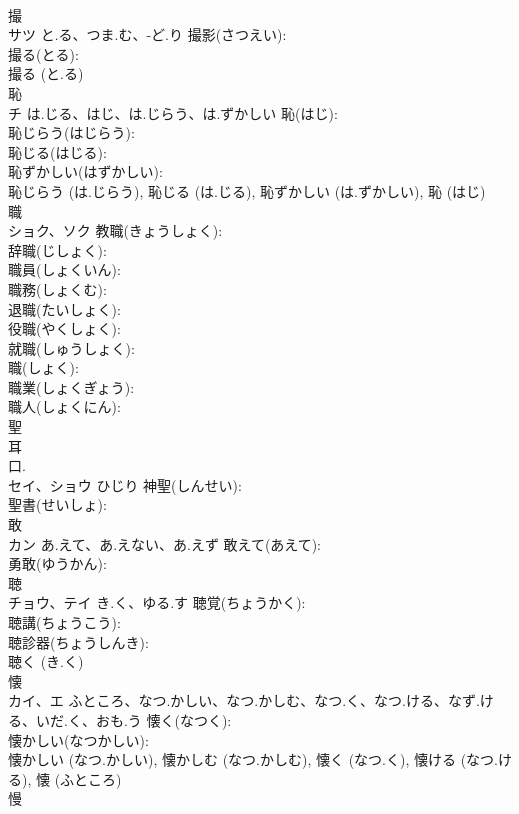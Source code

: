\documentclass[8pt]{extreport}
\begin{document}
\begin{CJK}{UTF8}{min}
\\	撮			
\\	サツ	と.る、つま.む、-ど.り	撮影(さつえい): 
\\	撮る(とる): 
\\	撮る (と.る)
\\	恥			
\\	チ	は.じる、はじ、は.じらう、は.ずかしい	恥(はじ): 
\\	恥じらう(はじらう): 
\\	恥じる(はじる): 
\\	恥ずかしい(はずかしい): 
\\	恥じらう (は.じらう), 恥じる (は.じる), 恥ずかしい (は.ずかしい), 恥 (はじ)
\\	職			
\\	ショク、ソク		教職(きょうしょく): 
\\	辞職(じしょく): 
\\	職員(しょくいん): 
\\	職務(しょくむ): 
\\	退職(たいしょく): 
\\	役職(やくしょく): 
\\	就職(しゅうしょく): 
\\	職(しょく): 
\\	職業(しょくぎょう): 
\\	職人(しょくにん): 
\\	聖			
\\	耳 
\\	口. 
\\	セイ、ショウ	ひじり	神聖(しんせい): 
\\	聖書(せいしょ): 
\\	敢			
\\	カン	あ.えて、あ.えない、あ.えず	敢えて(あえて): 
\\	勇敢(ゆうかん): 
\\	聴			
\\	チョウ、テイ	き.く、ゆる.す	聴覚(ちょうかく): 
\\	聴講(ちょうこう): 
\\	聴診器(ちょうしんき): 
\\	聴く (き.く)
\\	懐			
\\	カイ、エ	ふところ、なつ.かしい、なつ.かしむ、なつ.く、なつ.ける、なず.ける、いだ.く、おも.う	懐く(なつく): 
\\	懐かしい(なつかしい): 
\\	懐かしい (なつ.かしい), 懐かしむ (なつ.かしむ), 懐く (なつ.く), 懐ける (なつ.ける), 懐 (ふところ)
\\	慢			

\end{CJK}
\end{document}
